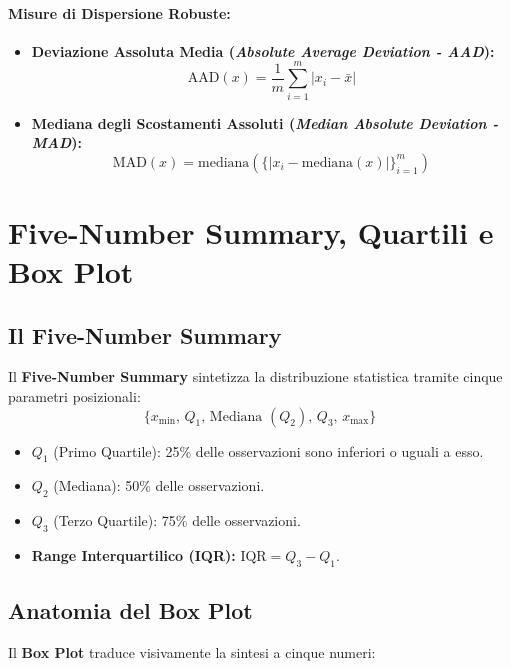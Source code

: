 \paragraph{Misure di Dispersione Robuste:}
\begin{itemize}
    \item \textbf{Deviazione Assoluta Media (\textit{Absolute Average Deviation - AAD}):}
    \begin{equation}
        \text{AAD}(x) = \frac{1}{m} \sum_{i=1}^m |x_i - \bar{x}|
    \end{equation}
    \item \textbf{Mediana degli Scostamenti Assoluti (\textit{Median Absolute Deviation - MAD}):}
    \begin{equation}
        \text{MAD}(x) = \text{mediana}\left(\Big\{|x_i - \text{mediana}(x)|\Big\}_{i=1}^m\right)
    \end{equation}
\end{itemize}

\FloatBarrier
\section{Five-Number Summary, Quartili e Box Plot}

\subsection{Il Five-Number Summary}
Il \textbf{Five-Number Summary} sintetizza la distribuzione statistica tramite cinque parametri posizionali:
\begin{equation}
    \Big\{x_{\min},\, Q_1,\, \text{Mediana } (Q_2),\, Q_3,\, x_{\max}\Big\}
\end{equation}
\begin{itemize}
    \item $Q_1$ (Primo Quartile): 25\% delle osservazioni sono inferiori o uguali a esso.
    \item $Q_2$ (Mediana): 50\% delle osservazioni.
    \item $Q_3$ (Terzo Quartile): 75\% delle osservazioni.
    \item \textbf{Range Interquartilico (IQR):} $\text{IQR} = Q_3 - Q_1$.
\end{itemize}

\subsection{Anatomia del Box Plot}
Il \textbf{Box Plot} traduce visivamente la sintesi a cinque numeri:

